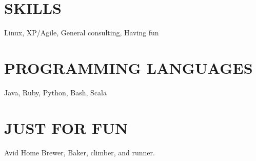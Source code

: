 \documentclass{res}
\begin{document}
\begin{resume}
\section{SKILLS}          
    Linux, XP/Agile, General consulting, Having fun\\

\section{PROGRAMMING LANGUAGES}          
    Java, Ruby, Python, Bash, Scala\\
     
\section{JUST FOR FUN}          
    Avid Home Brewer, Baker, climber, and runner.\\

\end{resume}
\end{document}
